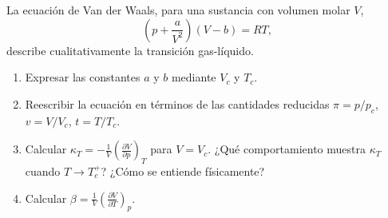 \documentclass[12pt,a4paper]{article}
\newcommand{\paren}[1]{\left( #1 \right)}
\newcommand{\pd}[3]{\left(\frac{\partial #1}{\partial #2}\right)_{#3}}
\begin{document}
    \begin{problema}
        La ecuación de Van der Waals, para una sustancia con volumen molar $V$,
        \begin{equation*}
            \paren{p+\frac{a}{V^{2}}}(V-b)=RT,
        \end{equation*}
        describe cualitativamente la transición gas-líquido.
        \begin{enumerate}
            \item[a)] Expresar las constantes $a$ y $b$ mediante $V_{c}$ y $T_{c}$.
            \item[b)] Reescribir la ecuación en términos de las cantidades reducidas
            $\pi=p/p_{c}$, $v=V/V_{c}$, $t=T/T_{c}$.
            \item[c)] Calcular $\kappa_{T}=-\frac1V\pd VpT$ para $V=V_{c}$. ¿Qué comportamiento
            muestra $\kappa_{T}$ cuando $T\to T_{c}^{+}$? ¿Cómo se entiende físicamente?
            \item[d)] Calcular $\beta=\frac1V\pd VTp$.
        \end{enumerate}
    \end{problema}
\end{document}
